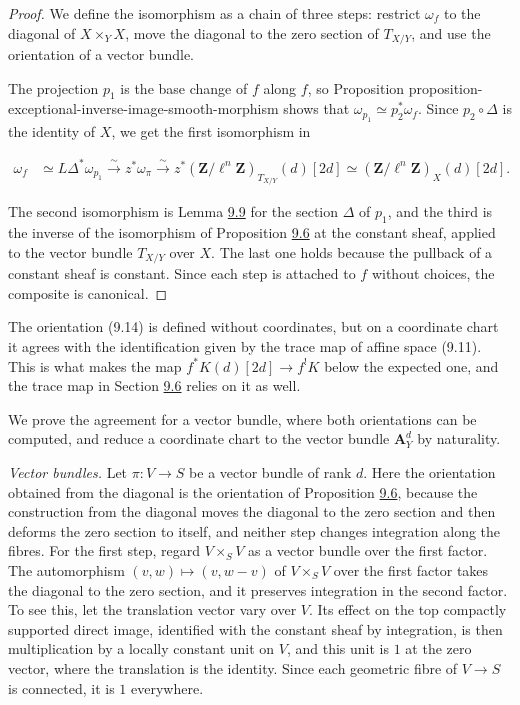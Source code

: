 \documentclass[11pt]{article}
\begin{document}
\begin{proof}[{Proof}]\label{bp35}%
We define the isomorphism as a chain of three steps: restrict \(\omega_f\) to the diagonal of \(X\times_YX\), move the diagonal to the zero section of \(T_{X/Y}\), and use the orientation of a vector bundle.

The projection \(p_1\) is the base change of \(f\) along \(f\), so Proposition proposition-exceptional-inverse-image-smooth-morphism shows that \(\omega_{p_1}\simeq p_2^{*}\omega_f\). Since \(p_2\circ\Delta\) is the identity of \(X\), we get the first isomorphism in

\[
\begin{aligned}
\omega_{f}
&\simeq L\Delta^{*}\omega_{p_1}
\xrightarrow{\sim}z^{*}\omega_{\pi}
\xrightarrow{\sim}z^{*}(\mathbf Z/\ell^n\mathbf Z)_{T_{X/Y}}(d)[2d]
\simeq(\mathbf Z/\ell^n\mathbf Z)_{X}(d)[2d].
\end{aligned}
\]

The second isomorphism is Lemma \hyperref[bp27]{9.9} for the section \(\Delta\) of \(p_1\), and the third is the inverse of the isomorphism of Proposition \hyperref[bp19]{9.6} at the constant sheaf, applied to the vector bundle \(T_{X/Y}\) over \(X\). The last one holds because the pullback of a constant sheaf is constant. Since each step is attached to \(f\) without choices, the composite is canonical.
\end{proof}

\label{bp36}%
The orientation (9.14) is defined without coordinates, but on a coordinate chart it agrees with the identification given by the trace map of affine space (9.11). This is what makes the map \(f^*K(d)[2d]\to f^!K\) below the expected one, and the trace map in Section \hyperref[bp72]{9.6} relies on it as well.

We prove the agreement for a vector bundle, where both orientations can be computed, and reduce a coordinate chart to the vector bundle \(\mathbf A^d_Y\) by naturality.

\emph{Vector bundles.} Let \(\pi:V\to S\) be a vector bundle of rank \(d\). Here the orientation obtained from the diagonal is the orientation of Proposition \hyperref[bp19]{9.6}, because the construction from the diagonal moves the diagonal to the zero section and then deforms the zero section to itself, and neither step changes integration along the fibres. For the first step, regard \(V\times_SV\) as a vector bundle over the first factor. The automorphism \((v,w)\mapsto(v,w-v)\) of \(V\times_SV\) over the first factor takes the diagonal to the zero section, and it preserves integration in the second factor. To see this, let the translation vector vary over \(V\). Its effect on the top compactly supported direct image, identified with the constant sheaf by integration, is then multiplication by a locally constant unit on \(V\), and this unit is \(1\) at the zero vector, where the translation is the identity. Since each geometric fibre of \(V\to S\) is connected, it is \(1\) everywhere.
\end{document}
